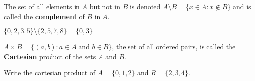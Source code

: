 \documentclass[../calc1-main.tex]{subfiles}
\begin{document}
The set of all elements in $A$ but not in $B$ is denoted $A\setminus B=\{x\in A:x\notin B\}$ and is called the \textbf{complement} of $B$ in $A.$

\begin{example}
$\{0,2,3,5\}\setminus \{2,5,7,8\}=\{0,3\}$
\end{example}

$A\times B=\{(a,b):a\in A \text{ and } b\in B\}$, the set of all ordered pairs, is called the \textbf{Cartesian} product of the sets $A$ and $B$.

\begin{example}
Write the cartesian product of $A=\{0,1,2\}$ and $B=\{2,3,4\}$.
\end{example}
\end{document}

